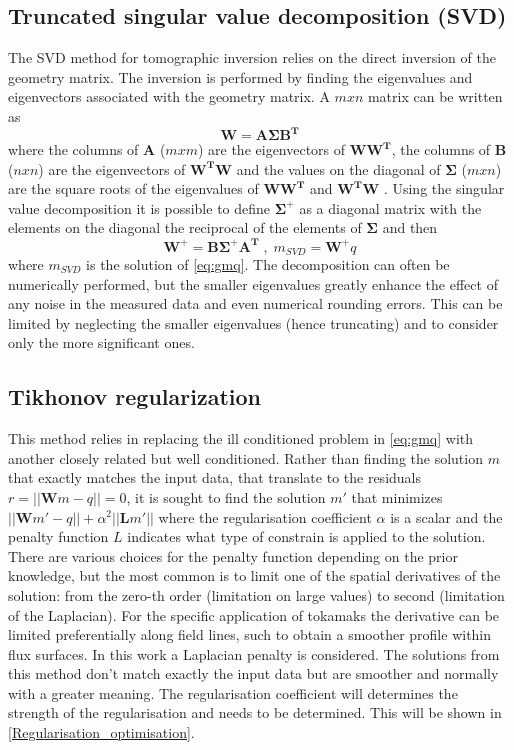 \subsection{Truncated singular value decomposition (SVD)}
The SVD method for tomographic inversion relies on the direct inversion of the geometry matrix. The inversion is performed by finding the eigenvalues and eigenvectors associated with the geometry matrix. A $mxn$ matrix can be written as 
\begin{equation}
\bm{W} = \bm{A \Sigma B^T}
\label{eq:svg1}
\end{equation}
where the columns of $\bm{A}$ ($mxm$) are the eigenvectors of $\bm{WW^T}$, the columns of $\bm{B}$ ($nxn$) are the eigenvectors of $\bm{W^TW}$ and the values on the diagonal of $\bm{\Sigma}$ ($mxn$) are the square roots of the eigenvalues of $\bm{WW^T}$ and $\bm{W^TW}$ \cite{Hansen1992}. Using the singular value decomposition it is possible to define $\bm{\Sigma}^+$ as a diagonal matrix with the elements on the diagonal the reciprocal of the elements of $\bm{\Sigma}$ and then
\begin{equation}
\bm{W^+} = \bm{B \Sigma^+ A^T} \; , \; m_{SVD} = \bm{W^+} q
\label{eq:svg2}
\end{equation}
where $m_{SVD}$ is the solution of \autoref{eq:gmq}.
The decomposition can often be numerically performed, but the smaller eigenvalues greatly enhance the effect of any noise in the measured data and even numerical rounding errors. \cite{Schou2015} This can be limited by neglecting the smaller eigenvalues (hence truncating) and to consider only the more significant ones.
\subsection{Tikhonov regularization}
This method relies in replacing the ill conditioned problem in \autoref{eq:gmq} with another closely related but well conditioned. Rather than finding the solution $m$ that exactly matches the input data, that translate to the residuals $r = ||\bm{W}m-q|| = 0$, it is sought to find the solution $m'$ that minimizes $||\bm{W}m'-q|| + \alpha^2 ||\bm{L}m'||$ where the regularisation coefficient $\alpha$ is a scalar and the penalty function $L$ indicates what type of constrain is applied to the solution. There are various choices for the penalty function depending on the prior knowledge, but the most common is to limit one of the spatial derivatives of the solution: from the zero-th order (limitation on large values) to second (limitation of the Laplacian). For the specific application of tokamaks the derivative can be limited preferentially along field lines, such to obtain a smoother profile within flux surfaces. In this work a Laplacian penalty is considered. \cite{Schou2015} The solutions from this method don't match exactly the input data but are smoother and normally with a greater meaning. The regularisation coefficient will determines the strength of the regularisation and needs to be determined. This will be shown in \autoref{Regularisation_optimisation}.
